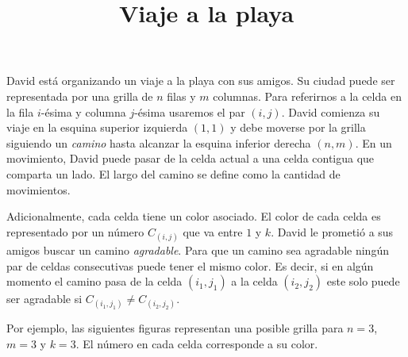 \documentclass{oci}
\title{Viaje a la playa}
\begin{document}
\begin{problemDescription}
David está organizando un viaje a la playa con sus amigos.
%
Su ciudad puede ser representada por una grilla de $n$ filas y $m$ columnas.
%
Para referirnos a la celda en la fila $i$-ésima y columna $j$-ésima usaremos
el par $(i,j)$.
%
David comienza su viaje en la esquina superior izquierda $(1, 1)$ y debe
moverse por la grilla siguiendo un \emph{camino} hasta alcanzar la esquina
inferior derecha $(n, m)$.
%
En un movimiento, David puede pasar de la celda actual a una celda contigua
que comparta un lado.
%
El largo del camino se define como la cantidad de movimientos.

Adicionalmente, cada celda tiene un color asociado.
%
El color de cada celda es representado por un número $C_{(i,j)}$ que va entre $1$ y $k$.
%
David le prometió a sus amigos buscar un camino \emph{agradable}.
%
Para que un camino sea agradable ningún par de celdas consecutivas
puede tener el mismo color.
%
Es decir, si en algún momento el camino pasa de la celda $(i_1,j_1)$ a la
celda $(i_2,j_2)$ este solo puede ser agradable si $C_{(i_1,j_1)} \neq C_{(i_2,j_2)}$.

Por ejemplo, las siguientes figuras representan una posible grilla para $n=3$, $m=3$ y $k=3$.
%
El número en cada celda corresponde a su color.
\begin{figure}[!h]
\centering
{}
\end{figure}
\end{problemDescription}
\end{document}
